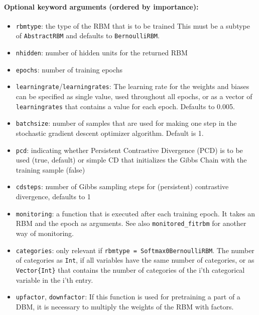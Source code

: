 \paragraph*{Optional keyword arguments (ordered by importance):}
\begin{itemize}
\item \texttt{rbmtype}: the type of the RBM that is to be trained  This must be a subtype of \texttt{AbstractRBM} and defaults to \texttt{BernoulliRBM}.


\item \texttt{nhidden}: number of hidden units for the returned RBM


\item \texttt{epochs}: number of training epochs


\item \texttt{learningrate}\slash \texttt{learningrates}: The learning rate for the weights and biases  can be specified as single value, used throughout all epochs, or as a vector  of \texttt{learningrates} that contains a value for each epoch. Defaults to 0.005.


\item \texttt{batchsize}: number of samples that are used for making one step in the  stochastic gradient descent optimizer algorithm. Default is 1.


\item \texttt{pcd}: indicating whether Persistent Contrastive Divergence (PCD) is to  be used (true, default) or simple CD that initializes the Gibbs Chain with  the training sample (false)


\item \texttt{cdsteps}: number of Gibbs sampling steps for (persistent)  contrastive divergence, defaults to 1


\item \texttt{monitoring}: a function that is executed after each training epoch.  It takes an RBM and the epoch as arguments.  See also \texttt{monitored\_fitrbm} for another way of monitoring.


\item \texttt{categories}: only relevant if \texttt{rbmtype = Softmax0BernoulliRBM}.  The number of categories as \texttt{Int}, if all variables have the same number  of categories, or as \texttt{Vector\{Int\}} that contains the number of categories  of the i'th categorical variable in the i'th entry.


\item \texttt{upfactor}, \texttt{downfactor}: If this function is used for pretraining a part of  a DBM, it is necessary to multiply the weights of the RBM with factors.



\end{itemize}
